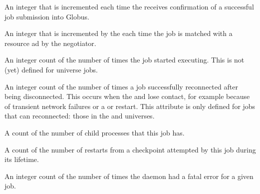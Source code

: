 \begin{description}
\item[\AdAttr{NumGlobusSubmits}:]   An integer that is incremented each
time the  receives confirmation of a successful job
submission into Globus.

\item[\AdAttr{NumJobMatches}:]  An integer that is incremented by the
 each time the job is matched with a resource ad by the
negotiator.

\item[\AdAttr{NumJobStarts}:]  An integer count of the number of times the
  job started executing.
  This is not (yet) defined for  universe jobs.

\item[\AdAttr{NumJobReconnects}:]  An integer count of the number of times a
  job successfully reconnected after being disconnected.
  This occurs when the
   and  lose contact,
  for example because of
  transient network failures or a  or 
  restart.
  This attribute is only defined for jobs that can reconnected:
  those in the  and  universes.

\item[\AdAttr{NumPids}:]  A count of the number of child processes that
this job has.

\item[\AdAttr{NumRestarts}:]  A count of the number of restarts from a
checkpoint attempted by this job during its lifetime.

\item[\AdAttr{NumShadowExceptions}:]  An integer count of the number of
  times the  daemon had a fatal error for a given job.


\end{description}
